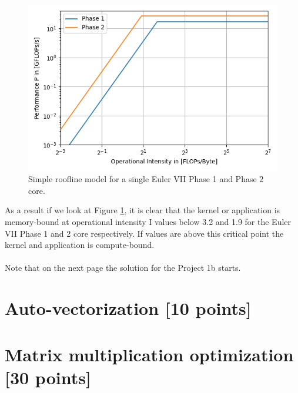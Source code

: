 \documentclass[unicode,11pt,a4paper,oneside,numbers=endperiod,openany]{scrartcl}
\begin{document}
\begin{figure}[H]
    \centering
    \includegraphics[width=\textwidth]{Images/performance.png}
    \caption{Simple roofline model for a single Euler VII Phase 1 and Phase 2 core.}
    \label{fig:performance}
\end{figure}
As a result if we look at Figure \ref{fig:performance}, it is clear that the kernel or application is memory-bound at 
operational intensity I values below 3.2 and 1.9 for the Euler VII Phase 1 and 2 core respectively. If values are above
this critical point the kernel and application is compute-bound. \\ \\
Note that on the next page the solution for the Project 1b starts.

\newpage
\section{Auto-vectorization [10 points]}

\section{Matrix multiplication optimization [30 points]}
\end{document}
